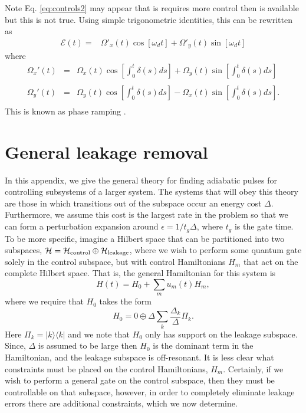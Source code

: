 \documentclass[pra,twocolumn,floatfix,superscriptaddress,eqsecnum]{revtex4-1}
\newcommand{\bra}[1]{\langle{#1}|}
\newcommand{\ket}[1]{|{#1}\rangle}
\newcommand{\be}{\begin{equation}}
\newcommand{\ee}{\end{equation}}
\begin{document}
Note Eq. \eqref{eq:controls2} may appear that is requires more control then is available but this is not true. Using simple trigonometric identities, this can be rewritten as
\begin{equation}\label{eq:controls3}
\begin{split}
\mathcal{E}(t)=&\Omega'_x(t)\cos\left[\omega_d t \right]+\Omega'_y(t)\sin\left[\omega_d t \right]
\end{split}
\end{equation}
where
\begin{eqnarray}
\Omega_x'(t) &=&\Omega_x(t)\cos\left[\int_0^t\delta(s)ds \right]+\Omega_y(t)\sin\left[\int_0^t\delta(s)ds \right]\nonumber\\\\
\Omega_y'(t) &=&\Omega_y(t)\cos\left[\int_0^t\delta(s)ds \right]-\Omega_x(t)\sin\left[\int_0^t\delta(s)ds \right].\nonumber\\
\end{eqnarray} This is known as phase ramping \cite{Patt1992}.

\section{General leakage removal}\label{A:general}

In this appendix, we give the general theory for finding adiabatic pulses for controlling subsystems of a larger system. The systems that will obey this theory are those in which transitions out of the subspace occur an energy cost $\Delta$. Furthermore, we assume this cost is the largest rate in the problem so that we  can form a perturbation expansion around $\epsilon=1/t_g\Delta$, where $t_g$ is the gate time. To be more specific, imagine a Hilbert space that can be partitioned into two subspaces, $\mathcal{H} = \mathcal{H}_{\rm{control}}\oplus \mathcal{H}_{\rm{leakage}}$, where we wish to perform some quantum gate solely in the control subspace, but with control Hamiltonians $H_m$ that act on the complete Hilbert space. That is, the general Hamiltonian for this system is
\be
H(t) = H_0 + \sum_m u_m(t) H_m,
\ee
 where we require that $H_0$ takes the form
 \be
H_0 = 0 \oplus \Delta \sum_k \frac{\Delta_k}{\Delta} \Pi_k.
\ee Here $\Pi_k=\ket{k}\bra{k}$ and we note that $H_0$ only has support on the leakage subspace.  Since, $\Delta$ is assumed to be large then $H_0$ is the dominant term in the Hamiltonian, and the leakage subspace is off-resonant.  It is less clear what constraints must be placed on the control Hamiltonians, $H_m$.  Certainly, if we wish to perform a general gate on the control subspace, then they must be controllable on that subspace, however, in order to completely eliminate leakage errors there are additional constraints, which we now determine.
\end{document}
